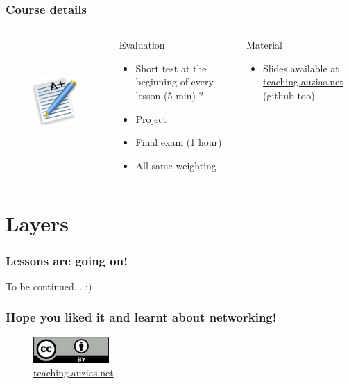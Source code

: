 \documentclass{beamer}
\begin{document}
  \begin{frame}
    \frametitle{Course details}
    \begin{columns}
        \begin{figure}[t]
          \centering
          \includegraphics[height=4cm]{./imgs/grade.pdf}
          \label{fig:marks}
        \end{figure}
        \begin{block}{Evaluation}
          \begin{itemize}
            \item Short test at the beginning of every lesson (5 min) ?
            \item Project
            \item Final exam (1 hour)
            \item All same weighting
          \end{itemize}
        \end{block}
        \begin{block}{Material}
          \begin{itemize}
            \item Slides available at \color{blue}\href{http://teaching.auzias.net}{teaching.auzias.net} \color{black} (github too)
          \end{itemize}
        \end{block}
    \end{columns}
  \end{frame}



\section{Layers}




  \begin{frame}
    \frametitle{Lessons are going on!}
    To be continued... ;)
  \end{frame}

%    

\begin{frame}
    \frametitle{Hope you liked it and learnt about networking!}
  \begin{figure}[p]
      \centering
      \includegraphics[height=1cm]{./imgs/cc40.jpg}
      \caption{\color{blue}\href{http://teaching.auzias.net}{teaching.auzias.net}}
    \label{fig:cc40}
  \end{figure}
\end{frame}
\end{document}
